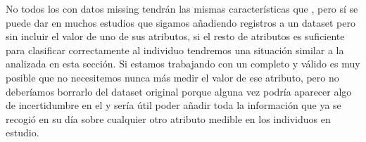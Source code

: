 No todos los \catalogos con datos missing tendrán las mismas características que \mushroom, pero sí se puede dar en muchos estudios que sigamos añadiendo registros a un dataset pero sin incluir el valor de uno de sus atributos, si el resto de atributos es suficiente para clasificar correctamente al individuo tendremos una situación similar a la analizada en esta sección. Si estamos trabajando con un \sCC completo y válido es muy posible que no necesitemos nunca más medir el valor de ese atributo, pero no deberíamos borrarlo del dataset original porque alguna vez podría aparecer algo de incertidumbre en el \catalogo y sería útil poder añadir toda la información que ya se recogió en su día sobre cualquier otro atributo medible en los individuos en estudio.

